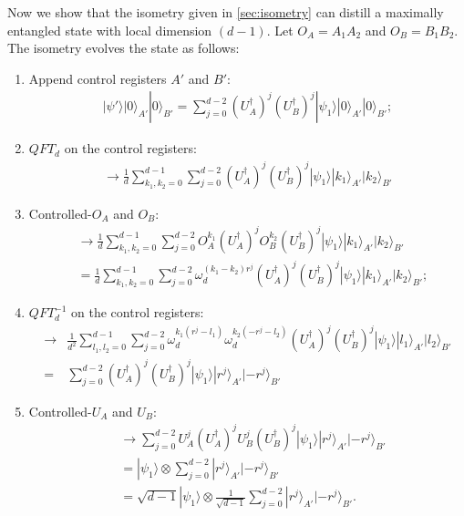 \documentclass[11pt,letterpaper]{article}
\newcommand{\ket}[1]{|#1\rangle}
\newcommand{\x}{\otimes}
\newcommand{\ct}{^{\dagger}}
\newcommand{\1}{\mathbb{1}}
\theoremstyle{definition}
\begin{document}
Now we show that the isometry given in \cref{sec:isometry} can distill a maximally entangled
state with local dimension $(d-1)$.
Let $O_A = A_1A_2$ and $O_B = B_1B_2$.
The isometry evolves the state as follows:
\begin{enumerate}
	\item Append control registers $A'$ and $B'$:
	\begin{align}
		\ket{\psi'} \ket{0}_{A'}\ket{0}_{B'} = 
		\sum_{j=0}^{d-2} (U_A\ct)^j (U_B\ct)^j \ket{\psi_1} \ket{0}_{A'}\ket{0}_{B'};
	\end{align}
	\item $QFT_d$ on the control registers:
	\begin{align}
		\to \frac{1}{d}\sum_{k_1,k_2 = 0}^{d-1} \sum_{j=0}^{d-2} (U_A\ct)^j (U_B\ct)^j \ket{\psi_1} \ket{k_1}_{A'}\ket{k_2}_{B'}
	\end{align}
	\item Controlled-$O_A$ and $O_B$:
	\begin{align}
		&\to \frac{1}{d}\sum_{k_1,k_2 = 0}^{d-1} \sum_{j=0}^{d-2} O_A^{k_1}(U_A\ct)^j O_B^{k_2}(U_B\ct)^j
		 \ket{\psi_1} \ket{k_1}_{A'}\ket{k_2}_{B'}\\
		&=\frac{1}{d} \sum_{k_1,k_2 = 0}^{d-1} \sum_{j=0}^{d-2} \omega_d^{(k_1-k_2)r^j}
		(U_A\ct)^j(U_B\ct)^j  \ket{\psi_1} \ket{k_1}_{A'}\ket{k_2}_{B'};
	\end{align}
	\item $QFT_d^{-1}$ on the control registers:
	\begin{align}
		\to &\frac{1}{d^2}\sum_{l_1,l_2 = 0}^{d-1}\sum_{j=0}^{d-2} \omega_d^{k_1(r^j-l_1)}\omega_d^{k_2(-r^j-l_2)}
		 (U_A\ct)^j(U_B\ct)^j \ket{\psi_1} \ket{l_1}_{A'}\ket{l_2}_{B'}\\
		= &\sum_{j=0}^{d-2}(U_A\ct)^j(U_B\ct)^j  \ket{\psi_1} \ket{r^j}_{A'}\ket{-r^j}_{B'}
	\end{align}
	\item Controlled-$U_A$ and $U_B$:
	\begin{align}
		&\to \sum_{j=0}^{d-2} U_A^j (U_A\ct)^j U_B^j (U_B\ct)^j  \ket{\psi_1} \ket{r^j}_{A'}\ket{-r^j}_{B'}\\
		&=  \ket{\psi_1} \x \sum_{j=0}^{d-2} \ket{r^j}_{A'}\ket{-r^j}_{B'}\\
		&= \sqrt{d-1} \ket{\psi_1} \x \frac{1}{\sqrt{d-1}} \sum_{j=0}^{d-2} \ket{r^j}_{A'}\ket{-r^j}_{B'}.
	\end{align}
\end{enumerate}
\end{document}
